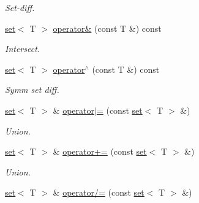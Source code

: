 \begin{DoxyCompactItemize}
\begin{DoxyCompactList}\small\item\em Set-\/diff. \end{DoxyCompactList}\item 
\hypertarget{classmerlin_1_1set_a5f97ef2bb5f230848ad018d86eb5a4b2}{}\hyperlink{classmerlin_1_1set}{set}$<$ T $>$ \hyperlink{classmerlin_1_1set_a5f97ef2bb5f230848ad018d86eb5a4b2}{operator\&} (const T \&) const \label{classmerlin_1_1set_a5f97ef2bb5f230848ad018d86eb5a4b2}

\begin{DoxyCompactList}\small\item\em Intersect. \end{DoxyCompactList}\item 
\hypertarget{classmerlin_1_1set_ac83716f6188e49336951c005ce2dc37d}{}\hyperlink{classmerlin_1_1set}{set}$<$ T $>$ \hyperlink{classmerlin_1_1set_ac83716f6188e49336951c005ce2dc37d}{operator$^\wedge$} (const T \&) const \label{classmerlin_1_1set_ac83716f6188e49336951c005ce2dc37d}

\begin{DoxyCompactList}\small\item\em Symm set diff. \end{DoxyCompactList}\item 
\hypertarget{classmerlin_1_1set_a61a296737e57dae6df4cfc2a76248e03}{}\hyperlink{classmerlin_1_1set}{set}$<$ T $>$ \& \hyperlink{classmerlin_1_1set_a61a296737e57dae6df4cfc2a76248e03}{operator$\vert$=} (const \hyperlink{classmerlin_1_1set}{set}$<$ T $>$ \&)\label{classmerlin_1_1set_a61a296737e57dae6df4cfc2a76248e03}

\begin{DoxyCompactList}\small\item\em Union. \end{DoxyCompactList}\item 
\hypertarget{classmerlin_1_1set_af383998860d966997045b18e9d801439}{}\hyperlink{classmerlin_1_1set}{set}$<$ T $>$ \& \hyperlink{classmerlin_1_1set_af383998860d966997045b18e9d801439}{operator+=} (const \hyperlink{classmerlin_1_1set}{set}$<$ T $>$ \&)\label{classmerlin_1_1set_af383998860d966997045b18e9d801439}

\begin{DoxyCompactList}\small\item\em Union. \end{DoxyCompactList}\item 
\hypertarget{classmerlin_1_1set_a5bb76573ee049dd6003155c87f468a80}{}\hyperlink{classmerlin_1_1set}{set}$<$ T $>$ \& \hyperlink{classmerlin_1_1set_a5bb76573ee049dd6003155c87f468a80}{operator/=} (const \hyperlink{classmerlin_1_1set}{set}$<$ T $>$ \&)\label{classmerlin_1_1set_a5bb76573ee049dd6003155c87f468a80}


\end{DoxyCompactItemize}
